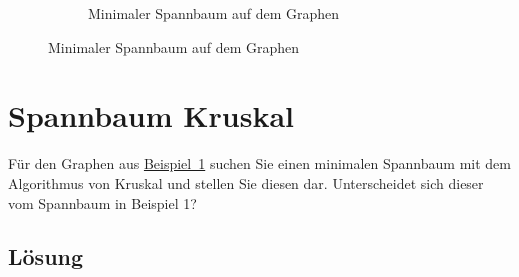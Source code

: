 \documentclass[a4paper,11pt]{report}
\begin{document}
\begin{figure}[htbp]
\begin{subfigure}[b]{0.3\textwidth}
            \caption{Minimaler Spannbaum auf dem Graphen}
            \label{fig:a01_graph_highlighted}
        \end{subfigure}
    \end{figure}

    \newpage

    \chapter{Spannbaum Kruskal}
    \label{ch:sbkruskal}
    Für den Graphen aus \hyperref[fig:a01_graph]{Beispiel~1} suchen Sie einen minimalen Spannbaum mit dem Algorithmus von
    Kruskal und stellen Sie diesen dar. Unterscheidet sich dieser vom Spannbaum in Beispiel 1?

    \section{Lösung}

    \begin{verbatim}

    \end{verbatim}
\end{document}
